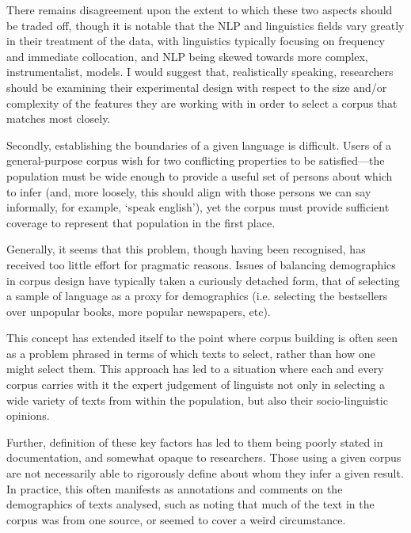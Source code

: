 There remains disagreement upon the extent to which these two aspects should be traded off, though it is notable that the NLP and linguistics fields vary greatly in their treatment of the data, with linguistics typically focusing on frequency and immediate collocation, and NLP being skewed towards more complex, instrumentalist, models.  I would suggest that, realistically speaking, researchers should be examining their experimental design with respect to the size and/or complexity of the features they are working with in order to select a corpus that matches most closely.



Secondly, establishing the boundaries of a given language is difficult.  Users of a general-purpose corpus wish for two conflicting properties to be satisfied---the population must be wide enough to provide a useful set of persons about which to infer (and, more loosely, this should align with those persons we can say informally, for example, `speak english'), yet the corpus must provide sufficient coverage to represent that population in the first place.

Generally, it seems that this problem, though having been recognised, has received too little effort for pragmatic reasons.  Issues of balancing demographics in corpus design have typically taken a curiously detached form, that of selecting a sample of language as a proxy for demographics (i.e. selecting the bestsellers over unpopular books, more popular newspapers, etc). %

This concept has extended itself to the point where corpus building is often seen as a problem phrased in terms of which texts to select, rather than how one might select them.  This approach has led to a situation where each and every corpus carries with it the expert judgement of linguists not only in selecting a wide variety of texts from within the population, but also their socio-linguistic opinions.

Further, definition of these key factors has led to them being poorly stated in documentation, and somewhat opaque to researchers.  Those using a given corpus are not necessarily able to rigorously define about whom they infer a given result.  In practice, this often manifests as annotations and comments on the demographics of texts analysed, such as noting that much of the text in the corpus was from one source, or seemed to cover a weird circumstance.


